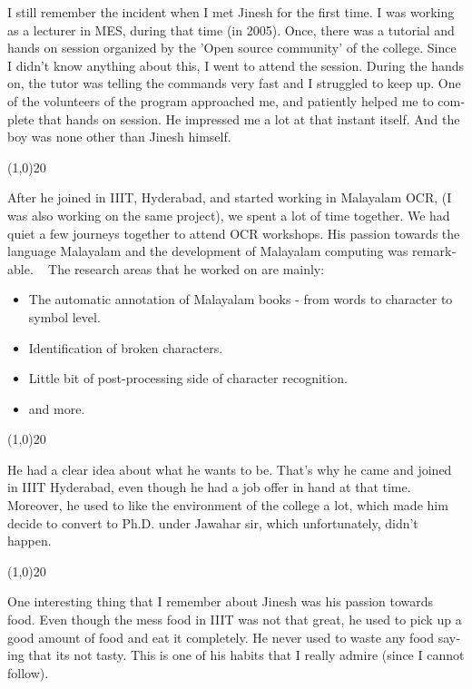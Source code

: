 \begin{english}
I still remember the incident when I met Jinesh for the first time. I was working as a lecturer in MES, during that time (in 2005). Once, there was a tutorial and hands on session organized by the 'Open source community' of the college. Since I didn’t know anything about this, I went to attend the session. During the hands on, the tutor was telling the commands very fast and I struggled to keep up. One of the volunteers of the program approached me, and patiently helped me to complete that hands on session. He impressed me a lot at that instant itself. And the boy was none other than Jinesh himself.
\begin{center}
\line(1,0){20} 
\end{center}
After he joined in IIIT, Hyderabad, and started working in Malayalam OCR, (I was also working on the same project), we spent a lot of time together. We had quiet a few journeys together to attend OCR workshops. His passion towards the language Malayalam and the development of Malayalam computing was remarkable.
 
The research areas that he worked on are mainly:
\begin{itemize}
\item The automatic annotation of Malayalam books - from words to character to symbol level.
\item Identification of broken characters.
\item Little bit of post-processing side of character recognition.
\item and more.
\end{itemize}
\begin{center}
\line(1,0){20} 
\end{center}
He had a clear idea about what he wants to be. That’s why he came and joined in IIIT Hyderabad, even though he had a job offer in hand at that time. Moreover, he used to like the environment of the college a lot, which made him decide to convert to Ph.D. under Jawahar sir, which unfortunately, didn’t happen.
\begin{center}
\line(1,0){20} 
\end{center}
One interesting thing that I remember about Jinesh was his passion towards food. Even though the mess food in IIIT was not that great, he used to pick up a good amount of food and eat it completely. He never used to waste any food saying that its not tasty. This is one of his habits that I really admire (since I cannot follow).
\begin{center}

\end{center}
\end{english}
